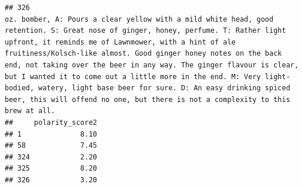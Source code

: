 \documentclass[
  a4paper,
]{article}
\newenvironment{Shaded}{\begin{snugshade}}{\end{snugshade}}
\newcommand{\NormalTok}[1]{#1}
\newcommand{\SpecialCharTok}[1]{\textcolor[rgb]{0.81,0.36,0.00}{\textbf{#1}}}
\newcommand{\StringTok}[1]{\textcolor[rgb]{0.31,0.60,0.02}{#1}}
\begin{document}
\begin{verbatim}
## 326                                                                                                                                                                                                                                                                                                                                                                                                                                                                                                                                                                                                                                                                                                                                                                                                                                                                                                                                                                                                                                                                                                                                                                                                                                                                                                                                                                                                                                                                                                                                                                                              oz. bomber, A: Pours a clear yellow with a mild white head, good retention. S: Great nose of ginger, honey, perfume. T: Rather light upfront, it reminds me of Lawnmower, with a hint of ale fruitiness/Kolsch-like almost. Good ginger honey notes on the back end, not taking over the beer in any way. The ginger flavour is clear, but I wanted it to come out a little more in the end. M: Very light-bodied, watery, light base beer for sure. D: An easy drinking spiced beer, this will offend no one, but there is not a complexity to this brew at all.
##     polarity_score2
## 1              8.10
## 58             7.45
## 324            2.20
## 325            8.20
## 326            3.20
\end{verbatim}

\begin{Shaded}
\end{Shaded}
\end{document}
